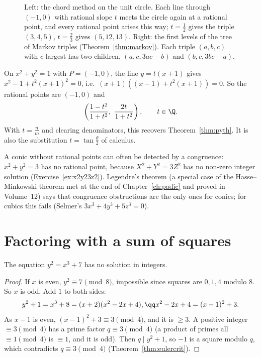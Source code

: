 \begin{figure}[ht]
\centering
{}
\caption{Left: the chord method on the unit circle. Each line through $(-1,0)$ with rational slope $t$ meets the circle again at a rational point, and every rational point arises this way; $t=\frac12$ gives the triple $(3,4,5)$, $t=\frac23$ gives $(5,12,13)$. Right: the first levels of the tree of Markov triples (Theorem~\ref{thm:markov}). Each triple $(a,b,c)$ with $c$ largest has two children, $(a,c,3ac-b)$ and $(b,c,3bc-a)$.}
\label{fig:chordmarkov}
\end{figure}

\begin{example}
On $x^2+y^2=1$ with $P=(-1,0)$, the line $y=t(x+1)$ gives $x^2-1+t^2(x+1)^2=0$, i.e.\ $(x+1)\left((x-1)+t^2(x+1)\right)=0$. So the rational points are $(-1,0)$ and
\[
\left(\frac{1-t^2}{1+t^2},\ \frac{2t}{1+t^2}\right),\qquad t\in\Q.
\]
With $t=\frac nm$ and clearing denominators, this recovers Theorem~\ref{thm:pyth}. It is also the substitution $t=\tan\frac\theta2$ of calculus.
\end{example}

A conic without rational points can often be detected by a congruence: $x^2+y^2=3$ has no rational point, because $X^2+Y^2=3Z^2$ has no non-zero integer solution (Exercise~\ref{ex:x2y23z2}). Legendre's theorem (a special case of the Hasse--Minkowski theorem met at the end of Chapter~\ref{ch:padic} and proved in Volume~12) says that congruence obstructions are the only ones for conics; for cubics this fails (Selmer's $3x^3+4y^3+5z^3=0$).

\section{Factoring with a sum of squares}

\begin{theorem}\label{thm:mordell7}
The equation $y^2=x^3+7$ has no solution in integers.
\end{theorem}
\begin{proof}
If $x$ is even, $y^2\equiv7\pmod8$, impossible since squares are $0,1,4$ modulo $8$. So $x$ is odd. Add $1$ to both sides:
\[
\begin{gathered}y^2+1=x^3+8=(x+2)(x^2-2x+4),\qq x^2-2x+4=(x-1)^2+3.\end{gathered}
\]
As $x-1$ is even, $(x-1)^2+3\equiv3\pmod4$, and it is $\ge3$. A positive integer $\equiv3\pmod4$ has a prime factor $q\equiv3\pmod4$ (a product of primes all $\equiv1\pmod4$ is $\equiv1$, and it is odd). Then $q\mid y^2+1$, so $-1$ is a square modulo $q$, which contradicts $q\equiv3\pmod4$ (Theorem~\ref{thm:eulercrit}).
\end{proof}

